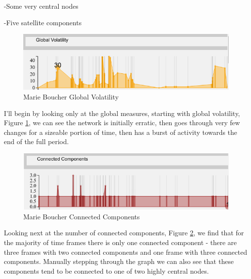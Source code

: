 -Some very central nodes

-Five satellite components

\begin{figure}[h!]
  \begin{center}
  \includegraphics[trim={0 0 0 0}, width=140mm]{./Figures/marieBoucherGlobalVolatility.png}
  \caption{Marie Boucher Global Volatility}
  \label{fig:marieBoucherGlobalVolatility}
  \end{center}
\end{figure}

I'll begin by looking only at the global measures, starting with global volatility, Figure \ref{fig:marieBoucherGlobalVolatility}, we can see the network is initially erratic, then goes through very few changes for a sizeable portion of time, then has a burst of activity towards the end of the full period. 

\begin{figure}[h!]
  \begin{center}
  \includegraphics[trim={0 0 0 0}, width=140mm]{./Figures/marieBoucherConnectedComponents.png}
  \caption{Marie Boucher Connected Components}
  \label{fig:marieBoucherConnectedComponents}
  \end{center}
\end{figure}

Looking next at the number of connected components, Figure \ref{fig:marieBoucherConnectedComponents}, we find that for the majority of time frames there is only one connected component - there are three frames with two connected components and one frame with three connected components. Manually stepping through the graph we can also see that these components tend to be connected to one of two highly central nodes.

